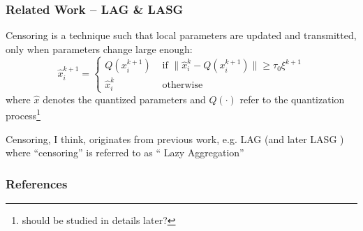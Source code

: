 
\begin{frame}
\frametitle{Related Work -- LAG \& LASG}

Censoring is a technique such that local parameters are updated and transmitted, only when parameters change large enough:
\begin{equation*}
    \widehat{x}_i^{k+1} = \begin{cases} Q(x_i^{k+1}) & \text{ if } \lVert \widehat{x}_i^{k}-Q(x_i^{k+1}) \rVert \geqslant \tau_0\xi^{k+1} \\ \widehat{x}_i^{k} & \text{ otherwise} \end{cases}
\end{equation*}
where $\widehat{x}$ denotes the quantized parameters and $Q(\cdot)$ refer to the quantization process\footnote{should be studied in details later?}

\pause
\vspace{0.6em}

Censoring, I think, originates from previous work, e.g. LAG \cite{chen2018lag} (and later LASG \cite{chen2020lasg}) where ``censoring'' is referred to as ``{\color{red} L}azy {\color{red} A}ggregation''

\end{frame}


\begin{frame}[allowframebreaks]
\frametitle{References}

{\footnotesize


}

\end{frame}



